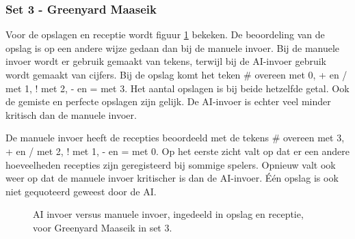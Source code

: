 \subsubsection{Set 3 - Greenyard Maaseik}
\label{sec:PL1_Greenyard3}
Voor de opslagen en receptie wordt figuur \ref{fig:PL1ServeMaaseik3} bekeken. De beoordeling van de opslag is op een andere wijze gedaan dan bij de manuele invoer. Bij de manuele invoer wordt er gebruik gemaakt van tekens, terwijl bij de AI-invoer gebruik wordt gemaakt van cijfers. Bij de opslag komt het teken \# overeen met 0, + en / met 1, ! met 2, - en = met 3.
Het aantal opslagen is bij beide hetzelfde getal. Ook de gemiste en perfecte opslagen zijn gelijk. De AI-invoer is echter veel minder kritisch dan de manuele invoer.

De manuele invoer heeft de recepties beoordeeld met de tekens \# overeen met 3, + en / met 2, ! met 1, - en = met 0. Op het eerste zicht valt op dat er een andere hoeveelheden recepties zijn geregisteerd bij sommige spelers. Opnieuw valt ook weer op dat de manuele invoer kritischer is dan de AI-invoer. Één opslag is ook niet gequoteerd geweest door de AI.

\begin{figure}[ht]
\centering
{}
\caption{AI invoer versus manuele invoer, ingedeeld in opslag en receptie, voor Greenyard Maaseik in set 3.}
\label{fig:PL1ServeMaaseik3}
\end{figure}


